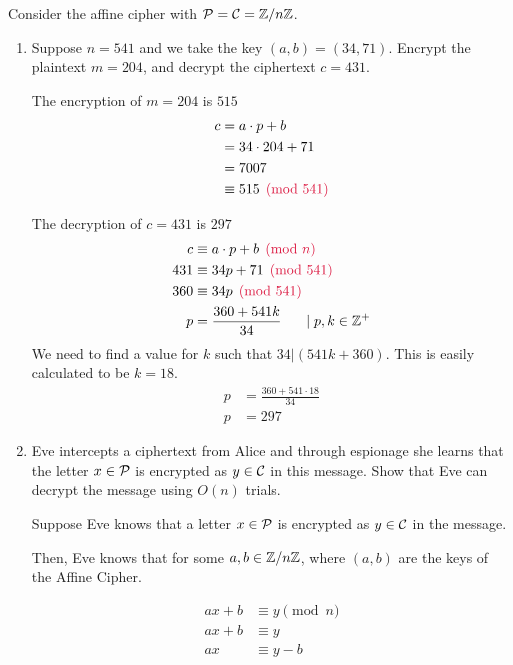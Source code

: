 \begin{problem}
Consider the affine cipher with $\mathcal{P}=\mathcal{C}=\mathbb{Z}/n\mathbb{Z}$.  
\begin{enumerate}\renewcommand{\itemsep}{3mm}
\item Suppose $n=541$ and we take the key $(a,b)=(34,71)$.  Encrypt the plaintext $m=204$, and decrypt the ciphertext $c=431$.
\begin{Answer}
\noindent
The encryption of $m=204$ is $515$
\begin{align*}
  c &= a \cdot p + b\\
  &= 34 \cdot 204 + 71\\
  &= 7007\\
  &\equiv 515 \crim{\pmod{541}}
\end{align*}

\noindent
The decryption of $c=431$ is $297$
\begin{align*}
  c &\equiv a \cdot p + b \crim{\pmod n}\\
  431 &\equiv 34p + 71 \crim{\pmod{541}}\\
  360 &\equiv 34p \crim{\pmod{541}}\\
  p &= \frac{360 + 541k}{34}  \hspace{15pt}\mid p,k \in \Z^+\\
\end{align*}
\noindent
We need to find a value for  $k$ such that $34 | (541k + 360)$.
This is easily calculated to be $k=18$.
\begin{align*}
  p &= \frac{360 + 541\cdot 18}{34}\\
  p &= 297
\end{align*}
\end{Answer}
\newpage
\item Eve intercepts a ciphertext from Alice
and through espionage she learns that the letter
$x \in \mathcal{P}$ is encrypted as $y \in \mathcal{C}$ in this message.
Show that Eve can decrypt the message using $O(n)$ trials.  
\begin{Answer}

Suppose Eve knows that a letter $x \in \mathcal{P}$ is encrypted as
$y \in \mathcal{C}$ in the message.

\noindent
Then, Eve knows that  for some $a, b \in \mathbb{Z}/n\mathbb{Z}$,
where $(a, b)$ are the keys of the Affine Cipher.

\begin{align*}
  ax + b &\equiv y \pmod n\\
  ax + b &\equiv y\\
  ax &\equiv y - b\\
\end{align*}


\end{Answer}
\end{enumerate}
\end{problem}
